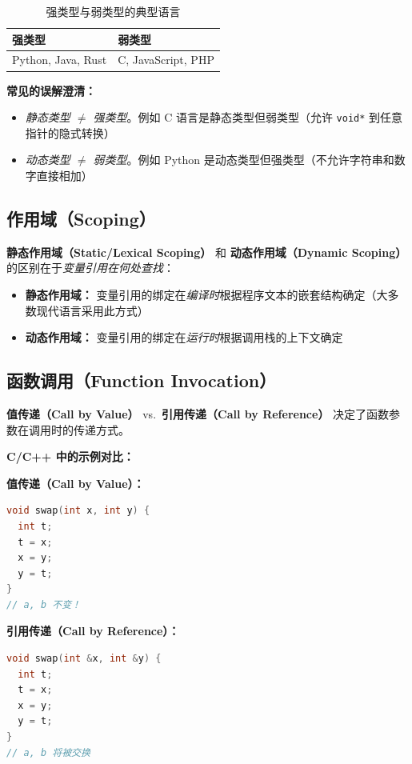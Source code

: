 \documentclass[12pt,a4paper]{ctexart}
\newcommand{\term}[1]{\textbf{\textcolor{mainblue}{#1}}}
\begin{document}
\begin{table}[h]
\centering
\begin{tabular}{@{}ll@{}}
\toprule
\textbf{强类型} & \textbf{弱类型} \\
\midrule
Python, Java, Rust & C, JavaScript, PHP \\
\bottomrule
\end{tabular}
\caption{强类型与弱类型的典型语言}
\end{table}

\begin{warnbox}
  \textbf{常见的误解澄清：}
  \begin{itemize}
    \item \emph{静态类型 $\neq$ 强类型}。例如 C 语言是静态类型但弱类型（允许 \texttt{void*} 到任意指针的隐式转换）
    \item \emph{动态类型 $\neq$ 弱类型}。例如 Python 是动态类型但强类型（不允许字符串和数字直接相加）
  \end{itemize}
\end{warnbox}

\subsection{作用域（Scoping）}

\begin{keybox}
  \term{静态作用域（Static/Lexical Scoping）} 和 \term{动态作用域（Dynamic Scoping）} 的区别在于\emph{变量引用在何处查找}：
  \begin{itemize}[itemsep=0.2em]
    \item \textbf{静态作用域：} 变量引用的绑定在\emph{编译时}根据程序文本的嵌套结构确定（大多数现代语言采用此方式）
    \item \textbf{动态作用域：} 变量引用的绑定在\emph{运行时}根据调用栈的上下文确定
  \end{itemize}
\end{keybox}

\subsection{函数调用（Function Invocation）}

\begin{keybox}
  \term{值传递（Call by Value）} vs.\ \term{引用传递（Call by Reference）} 决定了函数参数在调用时的传递方式。
\end{keybox}

\textbf{C/C++ 中的示例对比：}

\begin{minipage}{0.48\textwidth}
\textbf{值传递（Call by Value）：}
\begin{lstlisting}[language=C]
void swap(int x, int y) {
  int t;
  t = x;
  x = y;
  y = t;
}
// a, b 不变！
\end{lstlisting}
\end{minipage}
\hfill
\begin{minipage}{0.48\textwidth}
\textbf{引用传递（Call by Reference）：}
\begin{lstlisting}[language=C++]
void swap(int &x, int &y) {
  int t;
  t = x;
  x = y;
  y = t;
}
// a, b 将被交换
\end{lstlisting}
\end{minipage}
\end{document}

